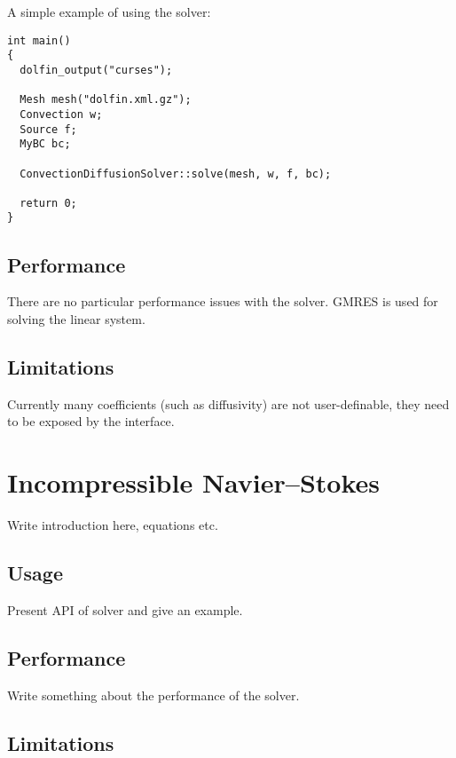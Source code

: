 A simple example of using the solver:

\begin{verbatim}
int main()
{
  dolfin_output("curses");

  Mesh mesh("dolfin.xml.gz");
  Convection w;
  Source f;
  MyBC bc;

  ConvectionDiffusionSolver::solve(mesh, w, f, bc);
  
  return 0;
}
\end{verbatim}


\subsection{Performance}

There are no particular performance issues with the solver. GMRES is
used for solving the linear system.

\subsection{Limitations}

Currently many coefficients (such as diffusivity) are not
user-definable, they need to be exposed by the interface.

\section{Incompressible Navier--Stokes}

Write introduction here, equations etc.

\subsection{Usage}

Present API of solver and give an example.

\subsection{Performance}

Write something about the performance of the solver.

\subsection{Limitations}

